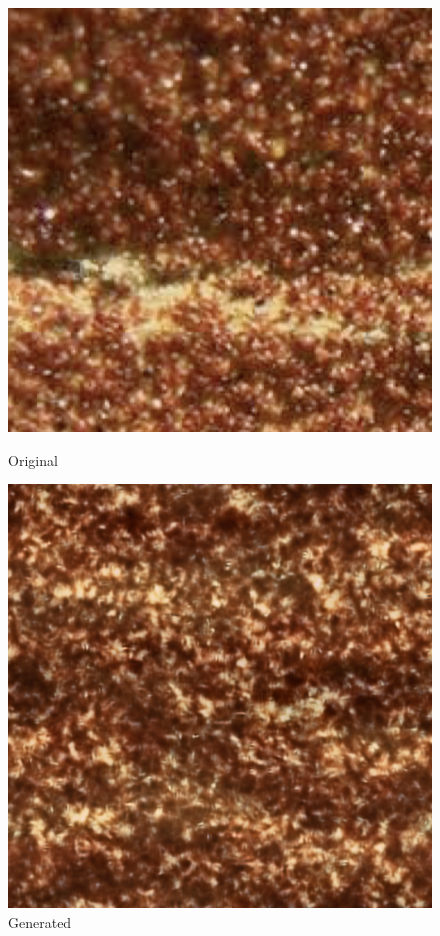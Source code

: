 \documentclass{article}
\begin{document}
    \begin{figure}[!htb]
    \begin{center}
      \includegraphics[scale=.34]{5/report/steerable/12.png}
      \caption{Original}
    \end{center}
    \endminipage \hfill
    \begin{center}
      \includegraphics[scale=.34]{5/report/steerable/12_c.png}
      \caption{Generated}
    \end{center}
    \endminipage
    \end{figure} 
    \pagebreak
\end{document}
